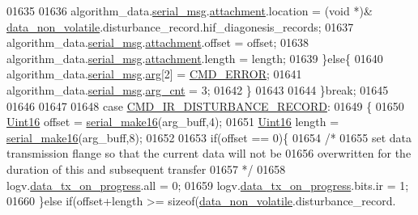 \begin{DoxyCode}
{{{{{01635 
01636                        algorithm\_data.\hyperlink{a00016_afcf5f557aea688aad985eec15269c1da}{serial\_msg}.\hyperlink{a00031_a040f6d5d58d18d8aeaf447eda7f50172}{attachment}.location    = (\textcolor{keywordtype}{void} *)&
      \hyperlink{a00060_a76ac5f917f5308dcd83de0d7c94559fb}{data\_non\_volatile}.disturbance\_record.hif\_diagonesis\_records;
01637                        algorithm\_data.\hyperlink{a00016_afcf5f557aea688aad985eec15269c1da}{serial\_msg}.\hyperlink{a00031_a040f6d5d58d18d8aeaf447eda7f50172}{attachment}.offset      = offset;
01638                        algorithm\_data.\hyperlink{a00016_afcf5f557aea688aad985eec15269c1da}{serial\_msg}.\hyperlink{a00031_a040f6d5d58d18d8aeaf447eda7f50172}{attachment}.length      = length;
01639                      \}\textcolor{keywordflow}{else}\{
01640                          algorithm\_data.\hyperlink{a00016_afcf5f557aea688aad985eec15269c1da}{serial\_msg}.\hyperlink{a00031_af7d6f762438c80072bd9dc0e4dd4ae1e}{arg}[2]               = 
      \hyperlink{a00021_a1764a522e9c1a59a59be8757c69fa494}{CMD\_ERROR};
01641                          algorithm\_data.\hyperlink{a00016_afcf5f557aea688aad985eec15269c1da}{serial\_msg}.\hyperlink{a00031_a7b79f40e2eeec288091afd340bf8f591}{arg\_cnt}              = 3;
01642                      \}
01643 
01644                 \}\textcolor{keywordflow}{break};
01645 
01646 
01647 
01648                  \textcolor{keywordflow}{case}  \hyperlink{a00021_ad37cd290161f0a245d189c3f4e014d4e}{CMD\_IR\_DISTURBANCE\_RECORD}:
01649                 \{
01650                     \hyperlink{a00072_a59a9f6be4562c327cbfb4f7e8e18f08b}{Uint16} offset = \hyperlink{a00031_abc17de32f14103a5be219df0d4ad9176}{serial\_make16}(arg\_buff,4);
01651                     \hyperlink{a00072_a59a9f6be4562c327cbfb4f7e8e18f08b}{Uint16} length = \hyperlink{a00031_abc17de32f14103a5be219df0d4ad9176}{serial\_make16}(arg\_buff,8);
01652 
01653                      \textcolor{keywordflow}{if}(offset == 0)\{
01654                          \textcolor{comment}{/*}
01655 \textcolor{comment}{                         set data transmission flange so that the current data will not be}
01656 \textcolor{comment}{                         overwritten for the duration of this and subsequent transfer}
01657 \textcolor{comment}{                       */}
01658                         logv.\hyperlink{a00021_a6cdefde69642ef511e3252c38be68516}{data\_tx\_on\_progress}.all       = 0;
01659                         logv.\hyperlink{a00021_a6cdefde69642ef511e3252c38be68516}{data\_tx\_on\_progress}.bits.ir   = 1;
01660                     \}\textcolor{keywordflow}{else} \textcolor{keywordflow}{if}(offset+length >= \textcolor{keyword}{sizeof}(\hyperlink{a00060_a76ac5f917f5308dcd83de0d7c94559fb}{data\_non\_volatile}.disturbance\_record.
}}}}}
\end{DoxyCode}
